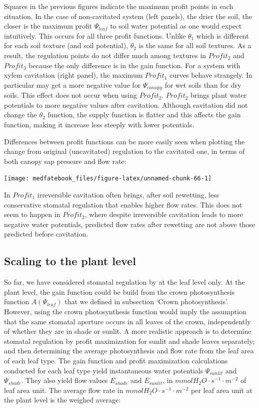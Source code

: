 \documentclass[]{book}
\begin{document}
Squares in the previous figures indicate the maximum profit points in
each situation. In the case of non-cavitated system (left panels), the
drier the soil, the closer is the maximum profit \(\Psi_{leaf}\) to soil
water potential as one would expect intuitively. This occurs for all
three profit functions. Unlike \(\theta_1\) which is different for each
soil texture (and soil potential), \(\theta_2\) is the same for all soil
textures. As a result, the regulation points do not differ much among
textures in \(Profit_2\) and \(Profit_3\) because the only difference is
in the gain function. For a system with xylem cavitation (right panel),
the maximum \(Profit_1\) curves behave strangely. In particular may get
a more negative value for \(\Psi_{canopy}\) for wet soils than for dry
soils. This effect does not occur when using \(Profit_2\). \(Profit_2\)
brings plant water potentials to more negative values after cavitation.
Although cavitation did not change the \(\theta_2\) function, the supply
function is flatter and this affects the gain function, making it
increase less steeply with lower potentials.

Differences between profit functions can be more easily seen when
plotting the change from original (uncavitated) regulation to the
cavitated one, in terms of both canopy sap pressure and flow rate:

\begin{center}\texttt{[image: medfatebook\_files/figure-latex/unnamed-chunk-66-1]} \end{center}

In \(Profit_1\) irreversible cavitation often brings, after soil
rewetting, less conservative stomatal regulation that enables higher
flow rates. This does not seem to happen in \(Profit_2\), where despite
irreversible cavitation leads to more negative water potentials,
predicted flow rates after rewetting are not above those predicted
before cavitation.

\subsection{Scaling to the plant
level}\label{scaling-to-the-plant-level}

So far, we have considered stomatal regulation by at the leaf level
only. At the plant level, the gain function could be build from the
crown photosynthesis function \(A(\Psi_{leaf})\) that we defined in
subsection `Crown photosynthesis'. However, using the crown
photosynthesis function would imply the assumption that the same
stomatal aperture occurs in all leaves of the crown, independently of
whether they are in shade or sunlit. A more realistic approach is to
determine stomatal regulation by profit maximization for sunlit and
shade leaves separately; and then determining the average photosynthesis
and flow rate from the leaf area of each leaf type. The gain function
and profit maximization calculations conducted for each leaf type yield
instantaneous water potentials \(\Psi_{sunlit}\) and \(\Psi_{shade}\).
They also yield flow values \(E_{shade}\) and \(E_{sunlit}\), in
\(mmol H_2O \cdot s^{-1} \cdot m^{-2}\) of leaf area unit. The average
flow rate in \(mmol H_2O \cdot s^{-1} \cdot m^{-2}\) per leaf area unit
at the plant level is the weighed average:
\end{document}
